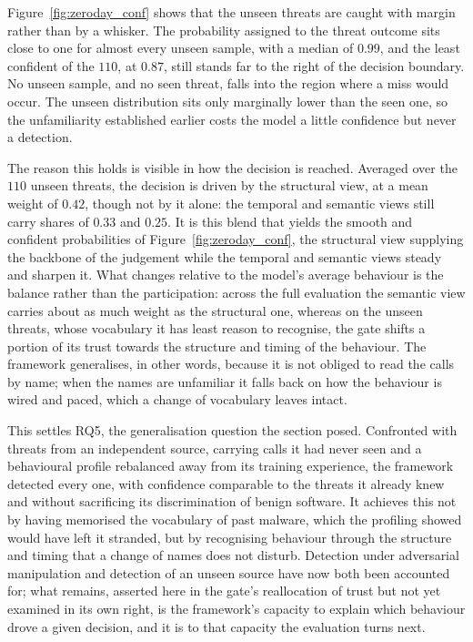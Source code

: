 \documentclass[%
    BCOR=10mm,
    DIV=13,
    toc=bibliography,
    toc=listof,
    oneside,
    12pt,
]{scrbook}
\begin{document}
Figure~\ref{fig:zeroday_conf} shows that the unseen threats are caught with margin
rather than by a whisker. The probability assigned to the threat outcome sits close
to one for almost every unseen sample, with a median of $0.99$, and the least
confident of the $110$, at $0.87$, still stands far to the right of the decision
boundary. No unseen sample, and no seen threat, falls into the region where a miss
would occur. The unseen distribution sits only marginally lower than the seen one,
so the unfamiliarity established earlier costs the model a little confidence but
never a detection.

The reason this holds is visible in how the decision is reached. Averaged over the
$110$ unseen threats, the decision is driven by the structural view, at a mean
weight of $0.42$, though not by it alone: the temporal and semantic views still
carry shares of $0.33$ and $0.25$. It is this blend that yields the smooth and
confident probabilities of Figure~\ref{fig:zeroday_conf}, the structural view
supplying the backbone of the judgement while the temporal and semantic views
steady and sharpen it. What changes relative to the model's average behaviour is
the balance rather than the participation: across the full evaluation the semantic
view carries about as much weight as the structural one, whereas on the unseen
threats, whose vocabulary it has least reason to recognise, the gate shifts a
portion of its trust towards the structure and timing of the behaviour. The
framework generalises, in other words, because it is not obliged to read the calls
by name; when the names are unfamiliar it falls back on how the behaviour is wired
and paced, which a change of vocabulary leaves intact.

This settles RQ5, the generalisation question the section posed. Confronted with threats
from an independent source, carrying calls it had never seen and a behavioural
profile rebalanced away from its training experience, the framework detected every
one, with confidence comparable to the threats it already knew and without
sacrificing its discrimination of benign software. It achieves this not by having
memorised the vocabulary of past malware, which the profiling showed would have
left it stranded, but by recognising behaviour through the structure and timing that
a change of names does not disturb. Detection under adversarial manipulation and
detection of an unseen source have now both been accounted for; what remains,
asserted here in the gate's reallocation of trust but not yet examined in its own
right, is the framework's capacity to explain which behaviour drove a given
decision, and it is to that capacity the evaluation turns next.
\end{document}
